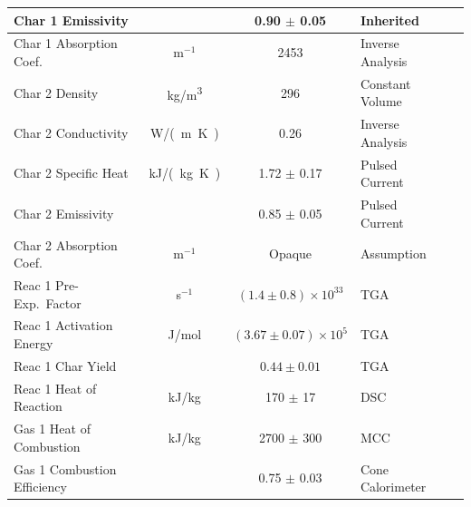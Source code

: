 \begin{table}[h!]
\begin{center}
\begin{tabular}{|l|c|c|l|l|}
Char 1 Emissivity           &               & 0.90 $\pm$ 0.05                   & Inherited                 &  \cite{Stoliarov:CF2010}                  \\ \hline
Char 1 Absorption Coef.     & m$^{-1}$      & 2453                              & Inverse Analysis          &  \cite{Stoliarov:CF2010}                  \\ \hline
Char 2 Density              & \unit{kg/m^3}      & 296                               & Constant Volume           &  \cite{Stoliarov:CF2010}                  \\ \hline
Char 2 Conductivity         & \unit{W/(m.K)}& 0.26                              & Inverse Analysis          &  \cite{Stoliarov:CF2010}                  \\ \hline
Char 2 Specific Heat        & \unit{kJ/(kg.K)}       & 1.72 $\pm$ 0.17                   & Pulsed Current            &  \cite{Stoliarov:CF2010,Matsumoto:1996}   \\ \hline
Char 2 Emissivity           &               & 0.85 $\pm$ 0.05                   & Pulsed Current            &  \cite{Stoliarov:CF2010,Matsumoto:1996}   \\ \hline
Char 2 Absorption Coef.     & m$^{-1}$      & Opaque                            & Assumption                &  \cite{Stoliarov:CF2010}                  \\ \hline
Reac 1 Pre-Exp.~Factor      & s$^{-1}$      & $(1.4 \pm 0.8) \times 10^{33}$    & TGA                       &  \cite{Stoliarov:CF2010}                  \\ \hline
Reac 1 Activation Energy    & J/mol       & $(3.67 \pm 0.07) \times 10^{5}$   & TGA                       &  \cite{Stoliarov:CF2010}                  \\ \hline
Reac 1 Char Yield           &               & $0.44 \pm 0.01$                   & TGA                       &  \cite{Stoliarov:CF2010}                  \\ \hline
Reac 1 Heat of Reaction     & kJ/kg         & 170 $\pm$ 17                      & DSC                       &  \cite{Stoliarov:PDS2008}                 \\ \hline
Gas 1 Heat of Combustion    & kJ/kg         & 2700 $\pm$ 300                    & MCC                       &  \cite{Stoliarov:CF2010}                  \\ \hline
Gas 1 Combustion Efficiency &               & 0.75 $\pm$ 0.03                   & Cone Calorimeter          &  \cite{Stoliarov:CF2010}                  \\ \hline

\end{tabular}
\end{center}
\end{table}
